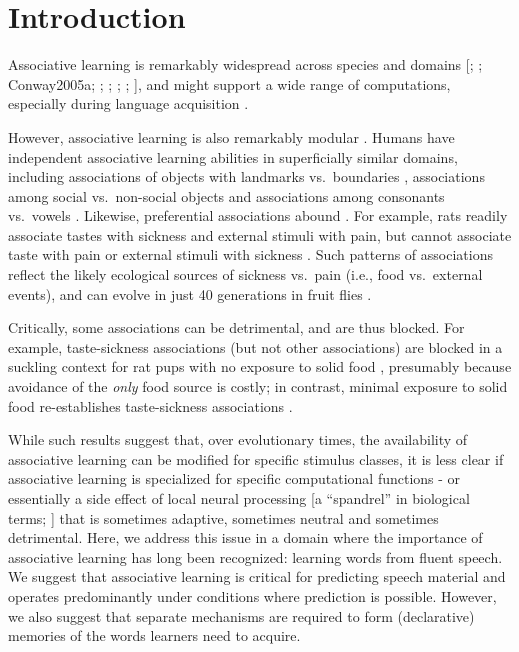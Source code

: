 \documentclass[
]{article}
\begin{document}
\hypertarget{introduction}{%
\section{Introduction}\label{introduction}}

Associative learning is remarkably widespread across species and domains
{[}\citet{Aslin1998}; \citet{Chen2015}; Conway2005a; \citet{Fiser2002};
\citet{Hauser2001}; \citet{Saffran-Science}; \citet{Toro2005-backward};
\citet{Turk-Browne-reversal}{]}, and might support a wide range of
computations, especially during language acquisition
\citep{Aslin2012, Seidenberg2002}.

However, associative learning is also remarkably modular
\citep{Endress-duplications}. Humans have independent associative
learning abilities in superficially similar domains, including
associations of objects with landmarks vs.~boundaries
\citep{Doeller2008}, associations among social vs.~non-social objects
\citep{Tompson2019} and associations among consonants vs.~vowels
\citep{Bonatti2005}. Likewise, preferential associations abound
\citep{Seligman1970}. For example, rats readily associate tastes with
sickness and external stimuli with pain, but cannot associate taste with
pain or external stimuli with sickness \citep{Garcia1974}. Such patterns
of associations reflect the likely ecological sources of sickness
vs.~pain (i.e., food vs.~external events), and can evolve in just 40
generations in fruit flies \citep{Dunlap2014}.

Critically, some associations can be detrimental, and are thus blocked.
For example, taste-sickness associations (but not other associations)
are blocked in a suckling context for rat pups with no exposure to solid
food \citep{Martin1979, Alberts1984}, presumably because avoidance of
the \emph{only} food source is costly; in contrast, minimal exposure to
solid food re-establishes taste-sickness associations
\citep{Gubernick1984}.

While such results suggest that, over evolutionary times, the
availability of associative learning can be modified for specific
stimulus classes, it is less clear if associative learning is
specialized for specific computational functions - or essentially a side
effect of local neural processing {[}a ``spandrel'' in biological terms;
\citet{Gould1979}{]} that is sometimes adaptive, sometimes neutral and
sometimes detrimental. Here, we address this issue in a domain where the
importance of associative learning has long been recognized: learning
words from fluent speech. We suggest that associative learning is
critical for predicting speech material and operates predominantly under
conditions where prediction is possible. However, we also suggest that
separate mechanisms are required to form (declarative) memories of the
words learners need to acquire.
\end{document}
